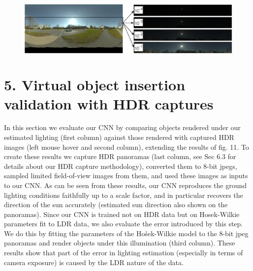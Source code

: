 \begin{figure}
\centering
\includegraphics[width=\mywidth]{db-sunny.jpg}
\caption{}
\end{figure}

\protect\hypertarget{virtualobjectinsertHDR}{}{}

\hypertarget{virtual-object-insertion-validation-with-hdr-captures}{%
\section{5. Virtual object insertion validation with HDR
captures}\label{virtual-object-insertion-validation-with-hdr-captures}}

In this section we evaluate our CNN by comparing objects rendered under
our estimated lighting (first column) against those rendered with
captured HDR images (left mouse hover and second column), extending the
results of fig. 11. To create these results we capture HDR panoramas
(last column, see Sec 6.3 for details about our HDR capture
methodology), converted them to 8-bit jpegs, sampled limited
field-of-view images from them, and used these images as inputs to our
CNN. As can be seen from these results, our CNN reproduces the ground
lighting conditions faithfully up to a scale factor, and in particular
recovers the direction of the sun accurately (estimated sun direction
also shown on the panoramas). Since our CNN is trained not on HDR data
but on Hosek-Wilkie parameters fit to LDR data, we also evaluate the
error introduced by this step. We do this by fitting the parameters of
the Hošek-Wilkie model to the 8-bit jpeg panoramas and render objects
under this illumination (third column). These results show that part of
the error in lighting estimation (especially in terms of camera
exposure) is caused by the LDR nature of the data.


\def\panoheight{0.25cm}

